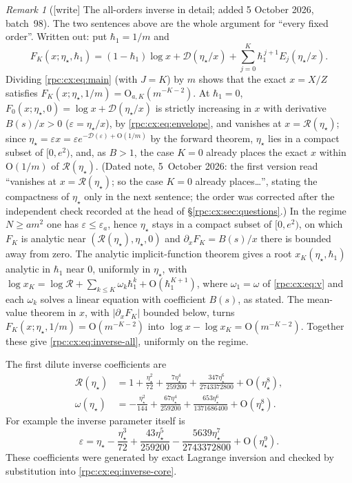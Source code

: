 \documentclass[11pt]{article}
\theoremstyle{definition}
\theoremstyle{remark}
\newtheorem{remark}[theorem]{Remark}
\numberwithin{equation}{section}
\begin{document}
\begin{remark}[\textsf{[write]} The all-orders inverse in detail; added 5 October 2026, batch~98]
\label{rpc:cx:rem:inverse-completion}
The two sentences above are the whole argument for ``every fixed order''.
Written out: put $\hbar_1=1/m$ and
\[
 F_K(x;\eta_\star,\hbar_1)=(1-\hbar_1)\log x+\mathcal D(\eta_\star/x)
 +\sum_{j=0}^K\hbar_1^{\,j+1}E_j(\eta_\star/x).
\]
Dividing \eqref{rpc:cx:eq:main} (with $J=K$) by $m$ shows that the exact
$x=X/Z$ satisfies $F_K(x;\eta_\star,1/m)=\mathrm O_{a,K}(m^{-K-2})$. At
$\hbar_1=0$, $F_0(x;\eta_\star,0)=\log x+\mathcal D(\eta_\star/x)$ is strictly
increasing in $x$ with derivative $B(s)/x>0$ ($\varepsilon=\eta_\star/x$),
by \eqref{rpc:cx:eq:envelope}, and vanishes at $x=\mathcal R(\eta_\star)$;
since $\eta_\star=\varepsilon x=\varepsilon e^{-\mathcal D(\varepsilon)+\mathrm O(1/m)}$
by the forward theorem, $\eta_\star$ lies in a compact subset of $[0,e^2)$,
and, as $B>1$, the case $K=0$ already places the exact $x$ within
$\mathrm O(1/m)$ of $\mathcal R(\eta_\star)$. (Dated note, 5~October 2026:
the first version read ``vanishes at $x=\mathcal R(\eta_\star)$; so the case
$K=0$ already places\ldots'', stating the compactness of $\eta_\star$ only
in the next sentence; the order was corrected after the independent check
recorded at the head of \S\ref{rpc:cx:sec:questions}.) In the regime $N\ge am^2$ one has
$\varepsilon\le\varepsilon_a$, hence $\eta_\star$ stays in a compact subset
of $[0,e^2)$, on which $F_K$ is analytic near $(\mathcal R(\eta_\star),
\eta_\star,0)$ and $\partial_xF_K=B(s)/x$ there is bounded away from zero.
The analytic implicit-function theorem gives a root
$x_K(\eta_\star,\hbar_1)$ analytic in $\hbar_1$ near $0$, uniformly in
$\eta_\star$, with $\log x_K=\log\mathcal R+\sum_{k\le K}\omega_k\hbar_1^k
+\mathrm O(\hbar_1^{K+1})$, where $\omega_1=\omega$ of \eqref{rpc:cx:eq:v} and
each $\omega_k$ solves a linear equation with coefficient $B(s)$, as stated.
The mean-value theorem in $x$, with $|\partial_xF_K|$ bounded below, turns
$F_K(x;\eta_\star,1/m)=\mathrm O(m^{-K-2})$ into
$\log x-\log x_K=\mathrm O(m^{-K-2})$. Together these give
\eqref{rpc:cx:eq:inverse-all}, uniformly on the regime.
\end{remark}

The first dilute inverse coefficients are
\begin{align}
 \mathcal R(\eta_\star)&=1+\frac{\eta_\star^2}{72}
          +\frac{7\eta_\star^4}{259200}
          +\frac{347\eta_\star^6}{2743372800}+\mathrm O(\eta_\star^8),
          \label{rpc:cx:eq:Rseries}\\
 \omega(\eta_\star)&=-\frac{\eta_\star^2}{144}
          +\frac{67\eta_\star^4}{259200}
          +\frac{653\eta_\star^6}{1371686400}+\mathrm O(\eta_\star^8).
          \label{rpc:cx:eq:vseries}
\end{align}
For example the inverse parameter itself is
\begin{equation}
 \varepsilon=\eta_\star-\frac{\eta_\star^3}{72}
       +\frac{43\eta_\star^5}{259200}
       -\frac{5639\eta_\star^7}{2743372800}+\mathrm O(\eta_\star^9).
\end{equation}
These coefficients were generated by exact Lagrange inversion and
checked by substitution into \eqref{rpc:cx:eq:inverse-core}.
\end{document}
